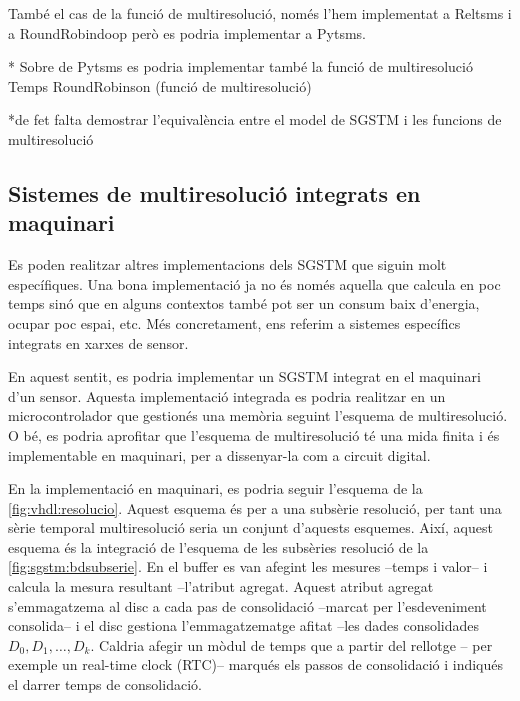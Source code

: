 També el cas de la funció de multiresolució, només l'hem implementat a Reltsms i a RoundRobindoop però es podria implementar a Pytsms.


* Sobre de Pytsms es podria implementar també la funció de multiresolució
Temps RoundRobinson (funció de multiresolució)

*de fet falta demostrar l'equivalència entre el model de SGSTM i les funcions de multiresolució






\subsection{Sistemes de multiresolució  integrats en maquinari}

Es poden realitzar altres implementacions dels \gls{SGSTM} que siguin
molt específiques. Una bona implementació ja no és només aquella que
calcula en poc temps sinó que en alguns contextos també pot ser un
consum baix d'energia, ocupar poc espai, etc.  Més concretament,
ens referim a sistemes específics integrats en xarxes de sensor. 

En aquest sentit, es podria implementar un \gls{SGSTM} integrat en el
maquinari d'un sensor.  Aquesta implementació integrada es podria
realitzar en un microcontrolador que gestionés una memòria seguint
l'esquema de multiresolució. O bé, es podria aprofitar que l'esquema
de multiresolució té una mida finita i és implementable en maquinari,
per a dissenyar-la com a circuit digital.







En la implementació en maquinari, es podria seguir l'esquema de la
\autoref{fig:vhdl:resolucio}. Aquest esquema és per a una subsèrie
resolució, per tant una sèrie temporal multiresolució seria un conjunt
d'aquests esquemes. Així, aquest esquema és la integració de l'esquema
de les subsèries resolució de la \autoref{fig:sgstm:bdsubserie}.  En
el buffer es van afegint les mesures --temps i valor-- i calcula la
mesura resultant --l'atribut agregat. Aquest atribut agregat
s'emmagatzema al disc a cada pas de consolidació --marcat per
l'esdeveniment consolida-- i el disc gestiona l'emmagatzematge afitat
--les dades consolidades $D_0,D_1,\dotsc,D_k$. Caldria afegir un mòdul
de temps que a partir del rellotge -- per exemple un real-time clock
(RTC)-- marqués els passos de consolidació i indiqués el darrer temps
de consolidació. 





